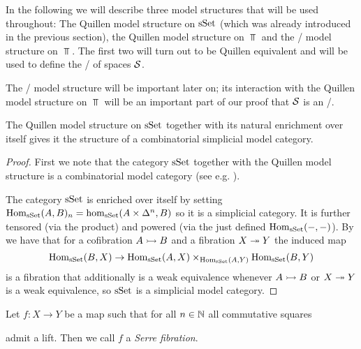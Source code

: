 In the following we will describe three model structures that will be used throughout: 
The Quillen model structure on $\operatorname{sSet}$ (which was already introduced in the previous section), the Quillen model structure on $\Top$ and the \Strom/ model structure on $\Top$.
The first two will turn out to be Quillen equivalent and will be used to define the \inftycat/ of spaces $\mathcal{S}$.

The \Strom/ model structure will be important later on; its interaction with the Quillen model structure on $\Top$ will be an important part of our proof that $\mathcal{S}$ is an \inftytop/.
\begin{prop}\label{prop:sSetCombSimpModelStructure}
    The Quillen model structure on $\operatorname{sSet}$ together with its natural enrichment over itself gives it the structure of a combinatorial simplicial model category.
    \begin{proof}
        First we note that the category $\operatorname{sSet}$ together with the Quillen model structure is a combinatorial model category (see e.g. \cite[Remark 7.11.15]{cisinski_2019}).
        
        The category $\operatorname{sSet}$ is enriched over itself by setting $\operatorname{Hom}_{\operatorname{sSet}}(A,B)_n=\hom_{\operatorname{sSet}}(A\times\Delta^n,B)$ so it is a simplicial category.
        It is further tensored (via the product) and powered (via the just defined $\operatorname{Hom}_{\operatorname{sSet}}(-,-)$).
        By \cite[Corollary 1.4.5.6, Theorem 3.1.3.1 and Theorem 3.1.3.5]{kerodon} we have that for a cofibration $A\xtailrightarrow{} B$ and a fibration $X\xtwoheadrightarrow{} Y$ the induced map 
        \begin{equation*}
            \operatorname{Hom}_{\operatorname{sSet}}(B,X)\to\operatorname{Hom}_{\operatorname{sSet}}(A,X)\times_{\operatorname{Hom}_{\operatorname{sSet}}(A,Y)}\operatorname{Hom}_{\operatorname{sSet}}(B,Y)
        \end{equation*}
        is a fibration that additionally is a weak equivalence whenever $A\xtailrightarrow{} B$ or $X\xtwoheadrightarrow{} Y$ is a weak equivalence, so $\operatorname{sSet}$ is a simplicial model category.
    \end{proof}
\end{prop}
\begin{definition}
    Let $f\colon X\to Y$ be a map such that for all $n\in\mathbb{N}$ all commutative squares
    \begin{center}
    \end{center}
    admit a lift. 
    Then we call $f$ a \emph{Serre fibration}.
\end{definition}
